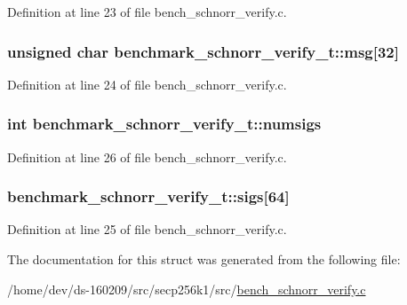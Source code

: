 Definition at line 23 of file bench\+\_\+schnorr\+\_\+verify.\+c.

\hypertarget{structbenchmark__schnorr__verify__t_a5230ec380d2ccfe3061b6b5f431cd466}{}
\subsubsection[{msg}]{\setlength{\rightskip}{0pt plus 5cm}unsigned char benchmark\+\_\+schnorr\+\_\+verify\+\_\+t\+::msg\mbox{[}32\mbox{]}}\label{structbenchmark__schnorr__verify__t_a5230ec380d2ccfe3061b6b5f431cd466}


Definition at line 24 of file bench\+\_\+schnorr\+\_\+verify.\+c.

\hypertarget{structbenchmark__schnorr__verify__t_af57633e576212bd6fe660a7722c1228f}{}
\subsubsection[{numsigs}]{\setlength{\rightskip}{0pt plus 5cm}int benchmark\+\_\+schnorr\+\_\+verify\+\_\+t\+::numsigs}\label{structbenchmark__schnorr__verify__t_af57633e576212bd6fe660a7722c1228f}


Definition at line 26 of file bench\+\_\+schnorr\+\_\+verify.\+c.

\hypertarget{structbenchmark__schnorr__verify__t_a2ae41817934debad3a4f17f101eee0a1}{}
\subsubsection[{sigs}]{ benchmark\+\_\+schnorr\+\_\+verify\+\_\+t\+::sigs\mbox{[}64\mbox{]}}\label{structbenchmark__schnorr__verify__t_a2ae41817934debad3a4f17f101eee0a1}


Definition at line 25 of file bench\+\_\+schnorr\+\_\+verify.\+c.



The documentation for this struct was generated from the following file\+:\begin{DoxyCompactItemize}
\item 
/home/dev/ds-\/160209/src/secp256k1/src/\hyperlink{bench__schnorr__verify_8c}{bench\+\_\+schnorr\+\_\+verify.\+c}\end{DoxyCompactItemize}
